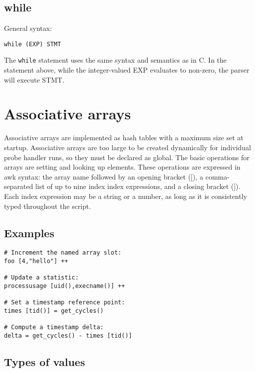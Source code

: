 \documentclass[twoside,english]{article}
\newenvironment{vindent}
{\begin{list}{}{\setlength{\listparindent}{6pt}}
\item[]}
{\end{list}}
\begin{document}
\subsection{while}
General syntax:

\begin{vindent}
\begin{verbatim}
while (EXP) STMT
\end{verbatim}
\end{vindent}
The \texttt{while} statement uses the same syntax and semantics as in C.
In the statement above, while the integer-valued EXP evaluates to non-zero,
the parser will execute STMT.


\section{Associative arrays\label{sec:Associative-Arrays}}
Associative arrays are implemented as hash tables with a maximum size set
at startup. Associative arrays are too large to be created dynamically for
individual probe handler runs, so they must be declared as global. The basic
operations for arrays are setting and looking up elements. These operations
are expressed in awk syntax: the array name followed by an opening bracket
({[}), a comma-separated list of up to nine index index expressions, and
a closing bracket (]). Each index expression may be a string or a number,
as long as it is consistently typed throughout the script.


\subsection{Examples}

\begin{vindent}
\begin{verbatim}
# Increment the named array slot:
foo [4,"hello"] ++

# Update a statistic:
processusage [uid(),execname()] ++

# Set a timestamp reference point:
times [tid()] = get_cycles()

# Compute a timestamp delta:
delta = get_cycles() - times [tid()]
\end{verbatim}
\end{vindent}

\subsection{Types of values}
\end{document}
